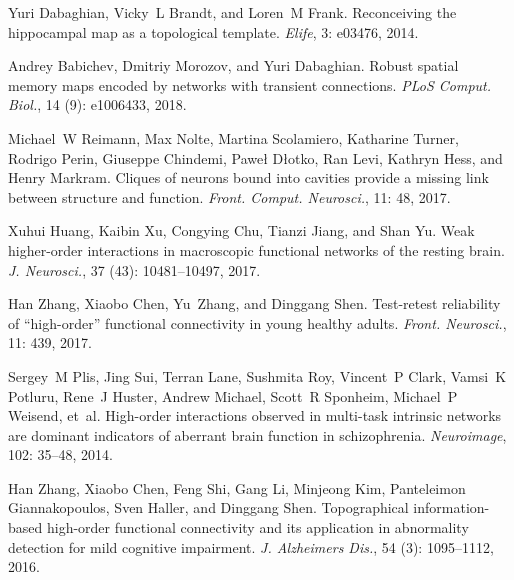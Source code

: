 Yuri Dabaghian, Vicky~L Brandt, and Loren~M Frank.
\newblock Reconceiving the hippocampal map as a topological template.
\newblock \emph{Elife}, 3: e03476, 2014.

Andrey Babichev, Dmitriy Morozov, and Yuri Dabaghian.
\newblock Robust spatial memory maps encoded by networks with transient
connections.
\newblock \emph{PLoS Comput. Biol.}, 14 (9): e1006433, 2018.

Michael~W Reimann, Max Nolte, Martina Scolamiero, Katharine Turner, Rodrigo
Perin, Giuseppe Chindemi, Pawe{\l} D{\l}otko, Ran Levi, Kathryn Hess, and
Henry Markram.
\newblock Cliques of neurons bound into cavities provide a missing link between
structure and function.
\newblock \emph{Front. Comput. Neurosci.}, 11: 48, 2017.

Xuhui Huang, Kaibin Xu, Congying Chu, Tianzi Jiang, and Shan Yu.
\newblock Weak higher-order interactions in macroscopic functional networks of
the resting brain.
\newblock \emph{J. Neurosci.}, 37 (43): 10481--10497, 2017.

Han Zhang, Xiaobo Chen, Yu~Zhang, and Dinggang Shen.
\newblock Test-retest reliability of ``high-order'' functional connectivity in
young healthy adults.
\newblock \emph{Front. Neurosci.}, 11: 439, 2017{}.

Sergey~M Plis, Jing Sui, Terran Lane, Sushmita Roy, Vincent~P Clark, Vamsi~K
Potluru, Rene~J Huster, Andrew Michael, Scott~R Sponheim, Michael~P Weisend,
et~al.
\newblock High-order interactions observed in multi-task intrinsic networks are
dominant indicators of aberrant brain function in schizophrenia.
\newblock \emph{Neuroimage}, 102: 35--48, 2014.

Han Zhang, Xiaobo Chen, Feng Shi, Gang Li, Minjeong Kim, Panteleimon
Giannakopoulos, Sven Haller, and Dinggang Shen.
\newblock Topographical information-based high-order functional connectivity
and its application in abnormality detection for mild cognitive impairment.
\newblock \emph{J. Alzheimers Dis.}, 54 (3): 1095--1112,
2016.

